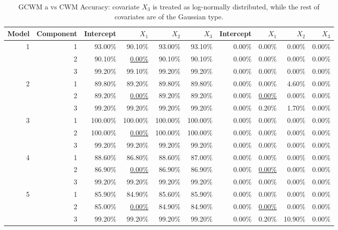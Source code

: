 \documentclass[11pt,letterpaper]{article}
\numberwithin{equation}{section}
\numberwithin{equation}{section}
\numberwithin{equation}{section}
\begin{document}
\begin{center}
\begin{table}[!htb]
\caption{GCWM a vs CWM Accuracy: covariate $X_3$ is treated as log-normally distributed, while the rest of covariates are of the Gaussian type.}
\label{gcwmAccuracy}
\begin{adjustwidth}{-1cm}{}
\begin{tabular}{|rrrrrr|rrrr|}
\hline\hline
Model & Component & Intercept & $X_1$ &$X_2$ & $X_3$& Intercept & $X_1$ &$X_2$ & $X_3$  \\
\hline
1     & 1         & 93.00\%   & 90.10\%  & 93.00\%  & 93.10\% & 0.00\% & 0.00\% & 0.00\% & 0.00\%   \\
      & 2         & 90.10\%   & \underline{0.00\%}   & 90.10\%  & 90.10\% & 0.00\% & 0.00\% & 0.00\% & 0.00\%  \\
      & 3         & 99.20\%   & 99.10\%  & 99.20\%  & 99.20\% & 0.00\% & 0.00\% & 0.00\% & 0.00\%  \\
2     & 1         & 89.80\%   & 89.20\%  & 89.80\%  & 89.80\% & 0.00\% & 0.00\% & 4.60\% & 0.00\%  \\
      & 2         & 89.20\%   &\underline{0.00\%}   & 89.20\%  & 89.20\% & 0.00\% & \underline{0.00\%} & 0.00\% & 0.00\%   \\
      & 3         & 99.20\%   & 99.20\%  & 99.20\%  & 99.20\% & 0.00\% & 0.20\% & 1.70\% & 0.00\%  \\
3     & 1         & 100.00\%  & 100.00\% & 100.00\% & 100.00\%  & 0.00\% & 0.00\% & 0.00\% & 0.00\% \\
      & 2         & 100.00\%  & \underline{0.00\%}   & 100.00\% & 100.00\% & 0.00\% & 0.00\% & 0.00\% & 0.00\% \\
      & 3         & 99.20\%   & 99.20\%  & 99.20\%  & 99.20\%  & 0.00\% & 0.00\% & 0.00\% & 0.00\%\\
      4 & 1 & 88.60\% & 86.80\% & 88.60\% & 87.00\%  & 0.00\% & 0.00\% & 0.00\%  & 0.00\%  \\
  & 2 & 86.90\% &\underline{ 0.00\%}  & 86.90\% & 86.90\% & 0.00\% & \underline{0.00\%} & 0.00\%  & 0.00\%  \\
  & 3 & 99.20\% & 99.20\% & 99.20\% & 99.20\% & 0.00\% & 0.00\% & 0.00\%  & 0.00\% \\
5 & 1 & 85.90\% & 84.90\% & 85.60\% & 85.90\% & 0.00\% & 0.00\% & 0.00\%  & 0.00\% \\
  & 2 & 85.00\% &\underline{ 0.00\%}  & 84.90\% & 84.90\% & 0.00\% & \underline{0.00\%} & 0.00\%  & 0.00\%  \\
  & 3 & 99.20\% & 99.20\% & 99.20\% & 99.20\% & 0.00\% & 0.20\% & 10.90\% & 0.00\% \\
      \hline\hline
\end{tabular}
\end{adjustwidth}
\end{table}
\end{center}
\end{document}
